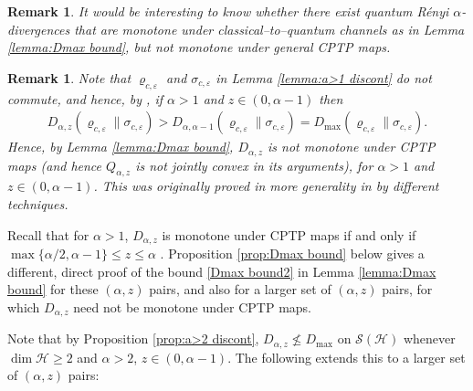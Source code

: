 \documentclass[unsortedaddress,superscriptaddress,pra,notitlepage]{revtex4}
\newtheorem{rem}[definition]{Remark}
\def\S{{\mathcal S}}
\def\ep{\varepsilon}
\def\rho{\varrho}
\def\hil{{\mathcal H}}
\begin{document}
\begin{rem}
It would be interesting to know whether there exist quantum R\'enyi $\alpha$-divergences
that are monotone under classical--to--quantum channels as in Lemma \ref{lemma:Dmax bound},
but not monotone under general CPTP maps.
\end{rem}

\begin{rem}
Note that $\rho_{c,\ep}$ and $\sigma_{c,\ep}$ in
Lemma \ref{lemma:a>1 discont} 
do not commute, and hence, by \cite{Hiai-ALT},
if $\alpha>1$ and $z\in(0,\alpha-1)$ then 
\begin{align*}
D_{\alpha,z}(\rho_{c,\ep}\|\sigma_{c,\ep})>
D_{\alpha,\alpha-1}(\rho_{c,\ep}\|\sigma_{c,\ep})=
D_{\max}(\rho_{c,\ep}\|\sigma_{c,\ep}).
\end{align*}
Hence, by Lemma \ref{lemma:Dmax bound}, $D_{\alpha,z}$ is not monotone under CPTP maps
(and hence $Q_{\alpha,z}$ is not jointly convex in its arguments), for 
$\alpha>1$ and $z\in(0,\alpha-1)$. This was originally proved in more generality in 
\cite[Proposition 5.4]{Hiai_concavity2013} by different techniques. 
\end{rem}

Recall that for $\alpha>1$, $D_{\alpha,z}$ is monotone under CPTP maps if and only if 
$\max\{\alpha/2,\alpha-1\}\le z\le \alpha$ \cite{Hiai_concavity2013,Zhang2018}. 
Proposition \ref{prop:Dmax bound} below gives a
different, direct proof of the bound \eqref{Dmax bound2} in Lemma \ref{lemma:Dmax bound} 
for these $(\alpha,z)$ pairs, and also for a larger set of $(\alpha,z)$ pairs, 
for which $D_{\alpha,z}$ need not be monotone under CPTP maps.

Note that by Proposition \ref{prop:a>2 discont}, 
$D_{\alpha,z}\nleq D_{\max}$ on $\S(\hil)$ whenever $\dim\hil\ge 2$ and 
$\alpha>2$, $z\in(0,\alpha-1)$. The following extends this to a larger set of 
$(\alpha,z)$ pairs:
\end{document}
